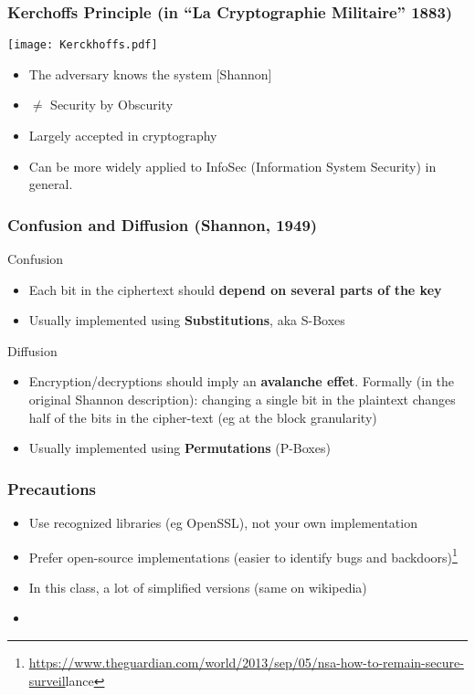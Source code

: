 \documentclass[
hyperref={pdfpagelabels=false}
,xcolor=table
]
{beamer}
\begin{document}
\begin{frame}
  \frametitle{Kerchoffs Principle {\normalsize (in ``La Cryptographie Militaire'' 1883)}}
  \begin{center}
    \texttt{[image: Kerckhoffs.pdf]}
  \end{center}
  
  \begin{itemize}
  \item The adversary knows the system [Shannon]
  \item $\ne$ Security by Obscurity
  \item Largely accepted in cryptography
  \item Can be more widely applied to InfoSec (Information System Security) in general. 
  \end{itemize}
\end{frame}


\begin{frame}
  \frametitle{Confusion and Diffusion (Shannon, 1949)}

  \begin{block}{Confusion}
    \begin{itemize}
    \item Each bit in the ciphertext should \textbf{depend on several parts of
      the key}
    \item Usually implemented using \textbf{Substitutions}, aka S-Boxes
    \end{itemize}
  \end{block}


  \begin{block}{Diffusion}
    \begin{itemize}
    \item Encryption/decryptions should imply an \textbf{avalanche effet}. Formally (in the original Shannon description): changing a single bit in the plaintext changes half of the bits in the cipher-text (eg at the block granularity)
    \item Usually implemented using \textbf{Permutations} (P-Boxes)
    \end{itemize}
  \end{block}
  
\end{frame}



\begin{frame}
  \frametitle{Precautions}

  \begin{itemize}
  \item Use recognized libraries (eg OpenSSL), not your own implementation
  \item Prefer open-source implementations (easier to identify bugs and backdoors)\footnote{\url{https://www.theguardian.com/world/2013/sep/05/nsa-how-to-remain-secure-surveil}lance}
  \item In this class, a lot of simplified versions (same on wikipedia)
  \item 
  \end{itemize}

  
\end{frame}
\end{document}
